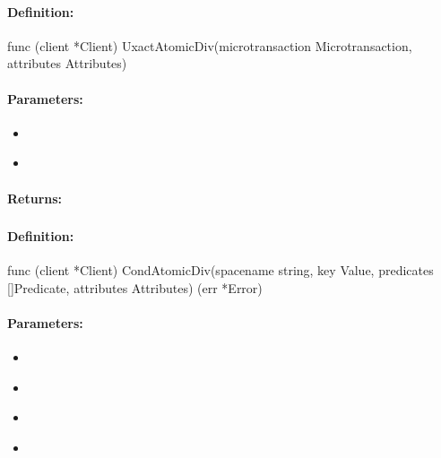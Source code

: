 \paragraph{Definition:}
\begin{gocode}
func (client *Client) UxactAtomicDiv(microtransaction Microtransaction, attributes Attributes)
\end{gocode}

\paragraph{Parameters:}
\begin{itemize}[noitemsep]
\item {}\\

\item {}\\

\end{itemize}

\paragraph{Returns:}


\pagebreak
\subsubsection{}
\label{api:Go:CondAtomicDiv}


\paragraph{Definition:}
\begin{gocode}
func (client *Client) CondAtomicDiv(spacename string, key Value, predicates []Predicate, attributes Attributes) (err *Error)
\end{gocode}

\paragraph{Parameters:}
\begin{itemize}[noitemsep]
\item {}\\

\item {}\\

\item {}\\

\item {}\\

\end{itemize}

